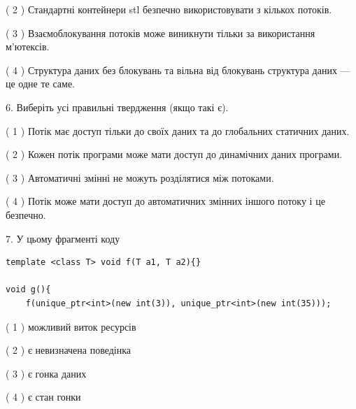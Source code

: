 \documentclass[12pt, ukrainian]{article}
\begin{document}
\begin {large}
{( 2 ) Стандартні контейнери stl безпечно використовувати з кількох потоків.%

( 3 ) Взаємоблокування потоків може виникнути тільки за використання м’ютексів.%

( 4 ) Структура даних без блокувань та вільна від блокувань структура даних --- це одне те саме.%
\newpage



\vspace{5mm}
6. Виберіть усі правильні твердження (якщо такі є).\par
\vspace{2mm}

( 1 ) Потік має доступ тільки до своїх даних та до глобальних статичних даних.%

( 2 ) Кожен потік програми може мати доступ до динамічних даних програми.%

( 3 ) Автоматичні змінні не можуть розділятися між потоками.%

( 4 ) Потік може мати доступ до автоматичних змінних іншого потоку і це безпечно.%


\vspace{5mm}
7. У цьому фрагменті коду
\begin{verbatim}
template <class T> void f(T a1, T a2){}

void g(){
    f(unique_ptr<int>(new int(3)), unique_ptr<int>(new int(35)));
\end{verbatim}

( 1 ) можливий виток ресурсів%

( 2 ) є невизначена поведінка%

( 3 ) є гонка даних%

( 4 ) є стан гонки%
}
\end {large}
\end{document}
